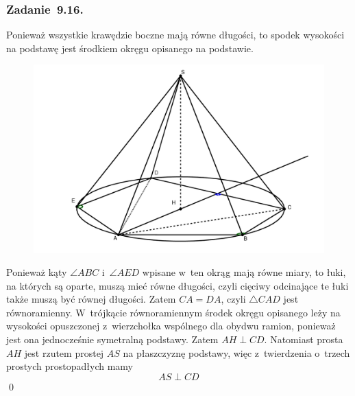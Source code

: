 \subsubsection*{Zadanie~9.16.}
Ponieważ wszystkie krawędzie boczne mają równe długości, to spodek wysokości na podstawę jest środkiem okręgu opisanego na podstawie.
\begin{figure}[H]
    \centering
    \includegraphics[width=\textwidth]{img/2021_02_12/16/space.png}
\end{figure}
\noindent
Ponieważ kąty \(\angle{ABC}\) i~\(\angle{AED}\) wpisane w~ten okrąg mają równe miary, to łuki, na których są oparte, muszą mieć równe długości, czyli cięciwy odcinające te łuki także muszą być równej długości. Zatem \(CA = DA\), czyli \(\triangle{CAD}\) jest równoramienny. W~trójkącie równoramiennym środek okręgu opisanego leży na wysokości opuszczonej z~wierzchołka wspólnego dla obydwu ramion, ponieważ jest ona jednocześnie symetralną podstawy. Zatem \(AH \perp CD\). Natomiast prosta \(AH\) jest rzutem prostej \(AS\) na płaszczyznę podstawy, więc z~twierdzenia o~trzech prostych prostopadłych mamy
\begin{equation*}
    AS \perp CD
\end{equation*}
\qed

